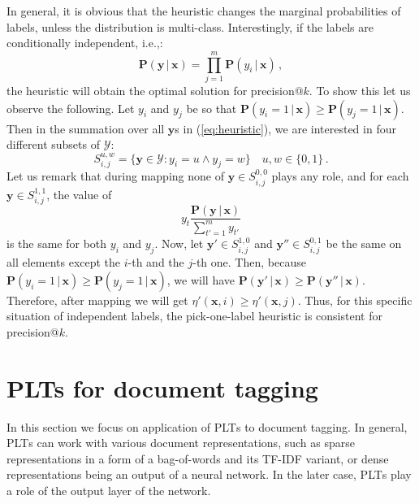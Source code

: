 \documentclass{article}
\newcommand{\Algo}[1]{\textsc{#1}}
\renewcommand{\vec}[1]{\boldsymbol{#1}}
\newcommand{\bx}{\vec{x}}
\newcommand{\by}{\vec{y}}
\newcommand{\calY}{\mathcal{Y}}
\newcommand{\prob}{\mathbf{P}}
\newcommand{\given}{\, | \,}
\newcommand{\sectionBefore}{-0pt}
\newcommand{\sectionAfter}{-0pt}
\begin{document}
In general, it is obvious that the heuristic changes the marginal probabilities of labels, unless the distribution is multi-class. 
Interestingly, if the labels are conditionally independent, i.e.,:
$$
\prob(\by \given \bx) = \prod_{j=1}^m \prob(y_i \given \bx)\,,
$$
the heuristic will obtain the optimal solution for precision@$k$. To show this let us observe the following.
Let $y_i$ and $y_j$ be so that $\prob(y_i = 1 \given \bx) \ge \prob(y_j = 1 \given \bx) $. Then in the summation over all $\by$s in (\ref{eq:heuristic}), we are interested in four different subsets of $\calY$: 
$$
S_{i,j}^{u,w}  =  \{\by\in \calY: y_i = u \land y_j = w\} \quad u,w \in \{0,1\} \,.
$$
Let us remark that during mapping none of $\by \in S^{0,0}_{i,j}$ plays any role, and for each $\by \in S^{1,1}_{i,j}$, the value of 
$$
y_t \frac{\prob(\by \given \bx)}{\sum_{t'=1}^m y_{t'}}
$$ 
is the same for both $y_i$ and $y_j$. Now, let $\by' \in S^{1,0}_{i,j}$ and $\by'' \in S^{0,1}_{i,j}$ be the same on all elements except the $i$-th and the $j$-th one. Then, because   $\prob(y_i = 1 \given \bx) \ge \prob(y_j = 1 \given \bx) $, we will have $\prob(\by' \given \bx) \ge \prob(\by'' \given \bx)$. Therefore, after mapping we will get $\eta'(\bx,i) \ge \eta'(\bx, j)$. 
Thus, for this specific situation of independent labels, the pick-one-label heuristic is consistent for precision@$k$.

%
%
%




\vspace{\sectionBefore}
\section{PLTs for document tagging}
\label{sec:plt-tagging}
\vspace{\sectionAfter}

In this section we focus on application of \Algo{PLT}s to document tagging. In general, \Algo{PLT}s can work with various document representations, such as sparse representations in a form of a bag-of-words and its TF-IDF variant, or dense representations being an output of a neural network. In the later case, \Algo{PLT}s play a role of the output layer of the network. 
  
\end{document}
